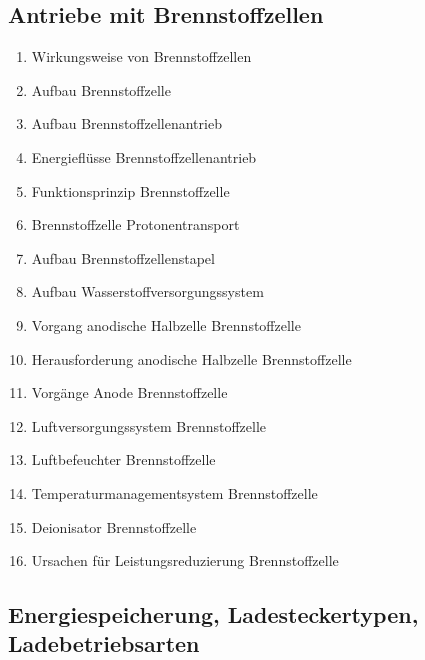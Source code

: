 \subsection{Antriebe mit
Brennstoffzellen}\label{antriebe-mit-brennstoffzellen}

\begin{enumerate}
\item
  Wirkungsweise von Brennstoffzellen\\
\item
  Aufbau Brennstoffzelle\\
\item
  Aufbau Brennstoffzellenantrieb\\
\item
  Energieflüsse Brennstoffzellenantrieb\\
\item
  Funktionsprinzip Brennstoffzelle\\
\item
  Brennstoffzelle Protonentransport\\
\item
  Aufbau Brennstoffzellenstapel\\
\item
  Aufbau Wasserstoffversorgungssystem\\
\item
  Vorgang anodische Halbzelle Brennstoffzelle\\
\item
  Herausforderung anodische Halbzelle Brennstoffzelle\\
\item
  Vorgänge Anode Brennstoffzelle\\
\item
  Luftversorgungssystem Brennstoffzelle\\
\item
  Luftbefeuchter Brennstoffzelle\\
\item
  Temperaturmanagementsystem Brennstoffzelle\\
\item
  Deionisator Brennstoffzelle\\
\item
  Ursachen für Leistungsreduzierung Brennstoffzelle
\end{enumerate}

\subsection{Energiespeicherung, Ladesteckertypen,
Ladebetriebsarten}\label{energiespeicherung-ladesteckertypen-ladebetriebsarten}

